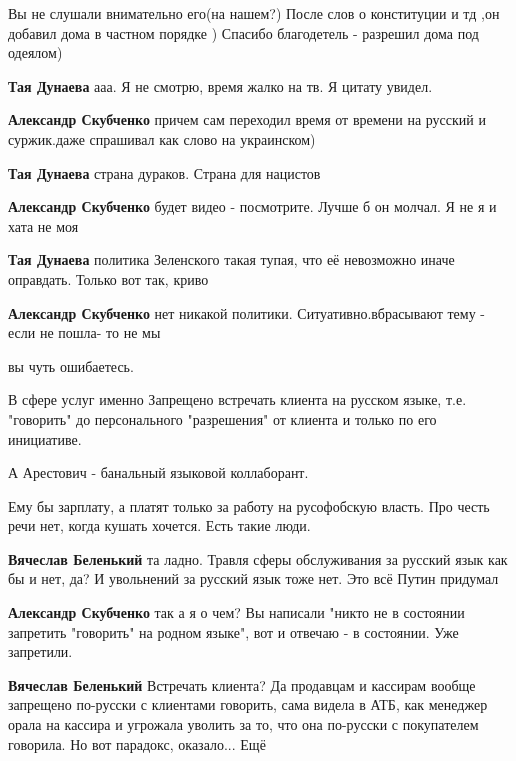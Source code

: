 \begin{itemize}

Вы не слушали внимательно его(на нашем?)
После слов о конституции и тд ,он добавил дома в частном порядке )
Спасибо благодетель - разрешил дома под одеялом)

\begin{itemize} %
\textbf{Тая Дунаева} ааа. Я не смотрю, время жалко на тв. Я цитату увидел.

\textbf{Александр Скубченко} причем сам переходил время от времени на русский и суржик.даже спрашивал как слово на украинском)

\textbf{Тая Дунаева} страна дураков. Страна для нацистов

\textbf{Александр Скубченко} будет видео - посмотрите.
Лучше б он молчал.
Я не я и хата не моя

\textbf{Тая Дунаева} политика Зеленского такая тупая, что её невозможно иначе оправдать. Только вот так, криво

\textbf{Александр Скубченко} нет никакой политики.
Ситуативно.вбрасывают тему - если не пошла- то не мы
\end{itemize} %


вы чуть ошибаетесь.

В сфере услуг именно Запрещено встречать клиента на русском языке, т.е.
"говорить" до персонального "разрешения" от клиента и только по его инициативе.

А Арестович - банальный языковой коллаборант.

Ему бы зарплату, а платят только за работу на русофобскую власть. Про честь
речи нет, когда кушать хочется. Есть такие люди.

\begin{itemize} %
\textbf{Вячеслав Беленький} та ладно. Травля сферы обслуживания за русский язык как бы и нет, да? И увольнений за русский язык тоже нет. Это всё Путин придумал

\textbf{Александр Скубченко} так а я о чем?
Вы написали "никто не в состоянии запретить "говорить" на родном языке", вот и отвечаю - в состоянии. Уже запретили.

\textbf{Вячеслав Беленький} Встречать клиента? Да продавцам и кассирам вообще запрещено по-русски с клиентами говорить, сама видела в АТБ, как менеджер орала на кассира и угрожала уволить за то, что она по-русски с покупателем говорила. Но вот парадокс, оказало... Ещё


\end{itemize}
\end{itemize}
